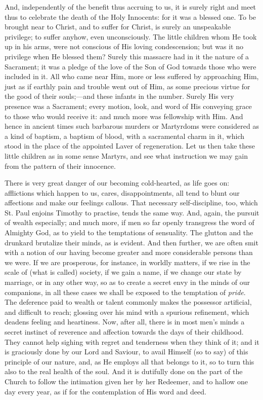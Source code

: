 And, independently of the benefit thus accruing to us, it is surely
right and meet thus to celebrate the death of the Holy Innocents: for
it was a blessed one. To be brought near to Christ, and to suffer for
Christ, is surely an unspeakable privilege; to suffer anyhow, even
unconsciously. The little children whom He took up in his arms, were
not conscious of His loving condescension; but was it no privilege
when He blessed them? Surely this massacre had in it the nature of a
Sacrament; it was a pledge of the love of the Son of God towards those
who were included in it. All who came near Him, more or less suffered
by approaching Him, just as if earthly pain and trouble went out of
Him, as some precious virtue for the good of their souls;—and these
infants in the number. Surely His very presence was a Sacrament; every
motion, look, and word of His conveying grace to those who would
receive it: and much more was fellowship with Him. And hence in
ancient times such barbarous murders or Martyrdoms were considered as
a kind of baptism, a baptism of blood, with a sacramental charm in it,
which stood in the place of the appointed Laver of regeneration. Let
us then take these little children as in some sense Martyrs, and see
what instruction we may gain from the pattern of their innocence.

There is very great danger of our becoming cold-hearted, as life
goes on: afflictions which happen to us, cares, disappointments, all
tend to blunt our affections and make our feelings callous. That
necessary self-discipline, too, which St. Paul enjoins Timothy to
practise, tends the same way. And, again, the pursuit of wealth
especially; and much more, if men so far openly transgress the word of
Almighty God, as to yield to the temptations of sensuality. The
glutton and the drunkard brutalize their minds, as is evident. And
then further, we are often smit with a notion of our having become
greater and more considerable persons than we were. If we are
prosperous, for instance, in worldly matters, if we rise in the scale
of (what is called) society, if we gain a name, if we change our state
by marriage, or in any other way, so as to create a secret envy in the
minds of our companions, in all these cases we shall be exposed to the
temptation of \emph{pride}. The deference paid to wealth or talent
commonly makes the possessor artificial, and difficult to reach;
glossing over his mind with a spurious refinement, which deadens
feeling and heartiness. Now, after all, there is in most men's minds a
secret instinct of reverence and affection towards the days of their
childhood. They cannot help sighing with regret and tenderness when
they think of it; and it is graciously done by our Lord and Saviour,
to avail Himself (so to say) of this principle of our nature, and, as
He employs all that belongs to it, so to turn this also to the real
health of the soul. And it is dutifully done on the part of the Church
to follow the intimation given her by her Redeemer, and to hallow one
day every year, as if for the contemplation of His word and deed.

